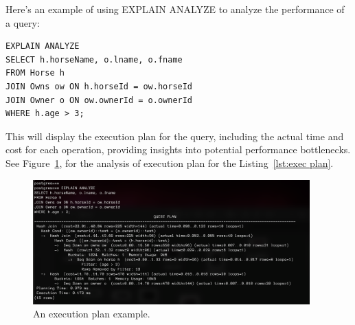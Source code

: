 \documentclass{article}
\begin{document}
Here's an example of using EXPLAIN ANALYZE to analyze the performance of a query:
\begin{lstlisting}
EXPLAIN ANALYZE
SELECT h.horseName, o.lname, o.fname
FROM Horse h
JOIN Owns ow ON h.horseId = ow.horseId
JOIN Owner o ON ow.ownerId = o.ownerId
WHERE h.age > 3;
\end{lstlisting} \label{lst:exec plan}
This will display the execution plan for the query, including the actual time and cost for each operation, providing insights into potential performance bottlenecks. See Figure~\ref{fig:exec plan}, for the analysis of execution plan for the Listing~\ref{lst:exec plan}.

\begin{figure}
	\begin{center}
		\includegraphics[width=0.95\textwidth]{figures/exec_plan.png}
	\end{center}
	\caption{An execution plan example.}\label{fig:exec plan}
\end{figure}
\end{document}
